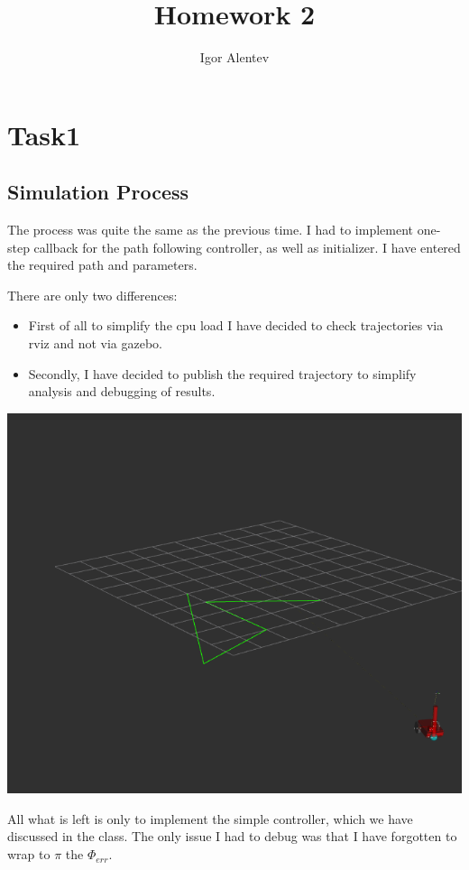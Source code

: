 \documentclass{article}
\title{Homework 2}
\author{Igor Alentev}
\date{\date{\today}}
\begin{document}
\maketitle
\newpage

\section*{Task1}
\subsection*{Simulation Process}

The process was quite the same as the previous time.
I had to implement one-step callback for the path following controller,
as well as initializer. I have entered the required path and parameters.

There are only two differences:

\begin{itemize}
    \item First of all to simplify the cpu load I 
have decided to check trajectories via rviz and not via gazebo.
    \item Secondly, I have decided to publish the required trajectory
    to simplify analysis and debugging of results.
\end{itemize}
\includegraphics[scale=0.67]{assets/rviz.png}

All what is left is only to implement the simple controller, which we 
have discussed in the class. The only issue I had to debug was that
I have forgotten to wrap to $\pi$ the $\Phi_{err}$.
\end{document}
